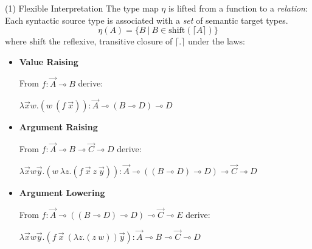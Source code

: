 \documentclass{beamer}
\newcommand{\li}{\!\multimap\!}
\newcommand{\trans}[1]{\lceil #1 \rceil}
\begin{document}
\begin{frame}{(1) Flexible Interpretation}
	\small
	The type map $\eta$ is lifted from a function to a \textit{relation}:
	Each syntactic source type is associated with a \textit{set} of semantic target types.
	\[
		\eta(A) = \{ B \ | \ B \in \mathrm{shift}(\trans{A}) \}
	\]
	where $\mathrm{shift}$ the reflexive, transitive closure of $\trans{.}$ under the laws:
	\begin{itemize}
		\item \textbf{Value Raising}
			{\footnotesize
			\begin{flushleft}
			From $f: \vec{A}\li B$ derive:
			\end{flushleft}
			\begin{flushright}
			\vspace{-10pt}
			$\lambda \vec{x}w.(w \ (f \ \vec{x})): \vec{A} \li (B\li D) \li D$		
			\end{flushright}
			}
		\item \textbf{Argument Raising}
			{\footnotesize
			\begin{flushleft}
			From $f: \vec{A}\li B \li \vec{C}\li D$ derive:
			\end{flushleft}
			\begin{flushright}
			\vspace{-10pt}
			$\lambda \vec{x}w\vec{y}.(w \ \lambda z.(f \ \vec{x} \ z \ \vec{y})): \vec{A}\li ((B\li D)\li D) \li \vec{C} \li D$
			\end{flushright}
			}
		\item \textbf{Argument Lowering}
			{\footnotesize
			\begin{flushleft}
			 From $f: \vec{A} \li ((B\li D) \li D) \li \vec{C} \li E$ derive:		
			\end{flushleft}
			\begin{flushright}
			\vspace{-10pt}
			$\lambda \vec{x}w\vec{y}.(f \ \vec{x} \ (\lambda z. (z \ w)) \vec{y}): \vec{A} \li B \li \vec{C} \li D$
			\end{flushright}
			}
	\end{itemize}
\end{frame}
\end{document}
